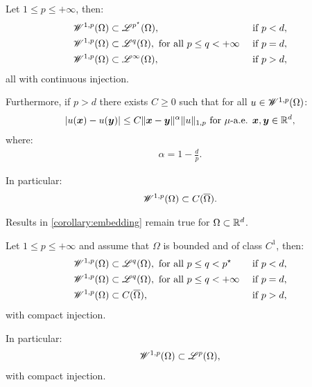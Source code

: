 \begin{corollary}
    Let $1 \leq p \leq +\infty$, then:
    \begin{align}
        & \mathscr{W}^{1, p}(\Omega) \subset \mathscr{L}^{p^{\star}}(\Omega), & \text{ if } p < d, \\
        & \mathscr{W}^{1, p}(\Omega) \subset \mathscr{L}^{q}(\Omega), \text{ for all } p \leq q < +\infty & \text{ if } p = d, \\
        & \mathscr{W}^{1, p}(\Omega) \subset \mathscr{L}^{\infty}(\Omega), & \text{ if } p > d,
    \end{align}
    all with continuous injection.

    Furthermore, if $p > d$ there exists $C \geq 0$ such that for all $u \in \mathscr{W}^{1, p}(\Omega)$:
    \begin{gather}
        \lvert u(\bm{x}) - u(\bm{y}) \rvert \leq C \lVert \bm{x} - \bm{y} \rVert^{\alpha} \lVert u \rVert_{1, p} \text{ for } \mu \text{-a.e. } \bm{x}, \bm{y} \in \mathbb{R}^{d},
    \end{gather}
    where:
    \begin{gather}
        \alpha = 1 - \frac{d}{p}.
    \end{gather}

    In particular:
    \begin{gather}
        \mathscr{W}^{1, p}(\Omega) \subset C(\overline{\Omega}).
    \end{gather}
\end{corollary}

\begin{corollary}
    Results in \ref{corollary:embedding} remain true for $\Omega \subset \mathbb{R}^{d}$.
\end{corollary}

\begin{theorem}
    Let $1 \leq p \leq +\infty$ and assume that $\Omega$ is bounded and of class $C^1$, then:
    \begin{align}
        & \mathscr{W}^{1, p}(\Omega) \subset \mathscr{L}^{q}(\Omega), \text{ for all } p \leq q < p^{\star} & \text{ if } p < d, \\
        & \mathscr{W}^{1, p}(\Omega) \subset \mathscr{L}^{q}(\Omega), \text{ for all } p \leq q < +\infty & \text{ if } p = d, \\
        & \mathscr{W}^{1, p}(\Omega) \subset C(\overline{\Omega}), & \text{ if } p > d,
    \end{align}
    with compact injection.

    In particular:
    \begin{gather}
        \mathscr{W}^{1, p}(\Omega) \subset \mathscr{L}^{p}(\Omega),
    \end{gather}
    with compact injection.
\end{theorem}


